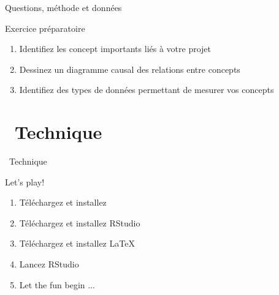 \documentclass[10pt]{beamer}
\begin{document}
\begin{frame}{Questions, méthode et données}
    \begin{block}{Exercice préparatoire}
    \begin{enumerate}[<+->]
        \item Identifiez les concept importants liés à votre projet
        \item Dessinez un diagramme causal des relations entre concepts
        \item Identifiez des types de données permettant de mesurer vos concepts
    \end{enumerate}
    \end{block}
\end{frame}

\section{\faLaptopCode~Technique }

\begin{frame}{\faLaptopCode~Technique}
    \begin{block}{Let's play!}
    \begin{enumerate}[<+->]
        \item Téléchargez et installez \faRProject
        \item Téléchargez et installez RStudio
        \item Téléchargez et installez \LaTeX
        \item Lancez RStudio
        \item Let the fun begin ... \faMagic
    \end{enumerate}
    \end{block}
\end{frame}

\maketitle
\end{document}
